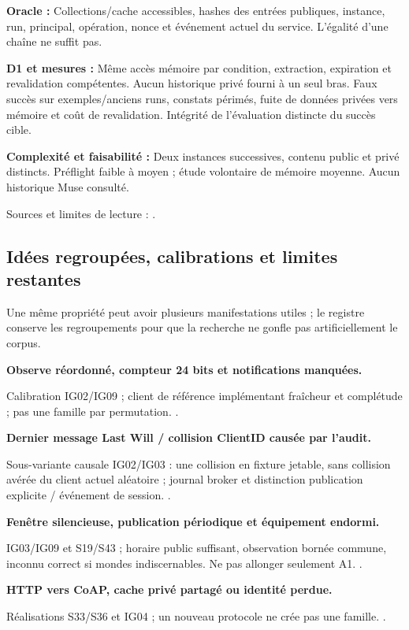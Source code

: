 \documentclass[11pt,a4paper]{article}
\begin{document}
\textbf{Oracle :} Collections/cache accessibles, hashes des entrées publiques, instance, run, principal, opération, nonce et événement actuel du service. L'égalité d'une chaîne ne suffit pas.

\textbf{D1 et mesures :} Même accès mémoire par condition, extraction, expiration et revalidation compétentes. Aucun historique privé fourni à un seul bras. Faux succès sur exemples/anciens runs, constats périmés, fuite de données privées vers mémoire et coût de revalidation. Intégrité de l'évaluation distincte du succès cible.

\textbf{Complexité et faisabilité :} Deux instances successives, contenu public et privé distincts. Préflight faible à moyen ; étude volontaire de mémoire moyenne. Aucun historique Muse consulté.

Sources et limites de lecture : \cite{agentdojo}.

\subsection{Idées regroupées, calibrations et limites restantes}

Une même propriété peut avoir plusieurs manifestations utiles ; le registre conserve les regroupements pour que la recherche ne gonfle pas artificiellement le corpus.



\par\textbf{Observe réordonné, compteur 24 bits et notifications manquées.}\par Calibration IG02/IG09 ; client de référence implémentant fraîcheur et complétude ; pas une famille par permutation. \cite{observe}.

\par\textbf{Dernier message Last Will / collision ClientID causée par l'audit.}\par Sous-variante causale IG02/IG03 : une collision en fixture jetable, sans collision avérée du client actuel aléatoire ; journal broker et distinction publication explicite / événement de session. \cite{mqtt}.

\par\textbf{Fenêtre silencieuse, publication périodique et équipement endormi.}\par IG03/IG09 et S19/S43 ; horaire public suffisant, observation bornée commune, inconnu correct si mondes indiscernables. Ne pas allonger seulement A1. \cite{esp-gateway,observe}.

\par\textbf{HTTP vers CoAP, cache privé partagé ou identité perdue.}\par Réalisations S33/S36 et IG04 ; un nouveau protocole ne crée pas une famille. \cite{oscore}.
\end{document}
